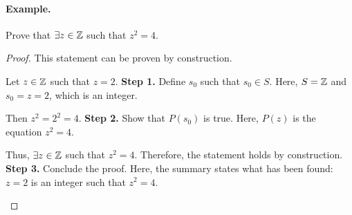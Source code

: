 \paragraph{Example.}
\begin{exercise}{
    Prove that $\exists z \in \mathbb{Z}$ such that $z^2 = 4$.
}
\end{exercise}
\begin{proof}{
    This statement can be proven by construction.

    \begin{annotatedpanel}[Setup.]{
        Let $z \in \mathbb{Z}$ such that $z = 2$.
    }{
        \textbf{Step 1.} Define $s_0$ such that $s_0 \in S$. %
        Here, $S = \mathbb{Z}$ and $s_0 = z = 2$, which is an integer.
    }
    \end{annotatedpanel}

    \begin{annotatedpanel}[Verification.]{
        Then $z^2 = 2^2 = 4$.
    }{
        \textbf{Step 2.} Show that $P(s_0)$ is true. %
        Here, $P(z)$ is the equation $z^2 = 4$.
    }
    \end{annotatedpanel}

    \begin{annotatedpanel}[Conclusion.]{
        Thus, $\exists z \in \mathbb{Z}$ such that $z^2 = 4$. %
        Therefore, the statement holds by construction. \qedhere
    }{
        \textbf{Step 3.} Conclude the proof. %
        Here, the summary states what has been found: %
        $z = 2$ is an integer such that $z^2 = 4$.
    }
    \end{annotatedpanel}
}
\end{proof}